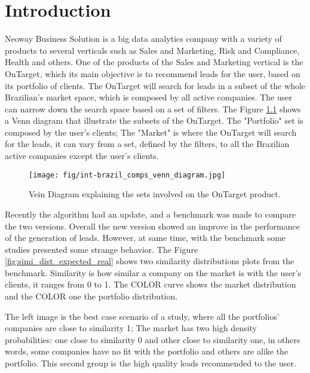 \chapter{Introduction} \label{cha:introduction}

\fancyhead[ER]{\sffamily\footnotesize{\leftmark}}
\fancyhead[OL]{\sffamily\footnotesize{\rightmark}}

Neoway Business Solution is a big data analytics company with a variety of products to several verticals such as Sales and Marketing, Risk and Compliance, Health and others. One of the products of the Sales and Marketing vertical is the OnTarget, which its main objective is to recommend leads for the user, based on its portfolio of clients. The OnTarget will search for leads in a subset of the whole Brazilian's market space, which is composed by all active companies. The user can narrow down the search space based on a set of filters. The Figure \ref{fig:braz_comps_venn_diagram} shows a Venn diagram that illustrate the subsets of the OnTarget. The "Portfolio" set is composed by the user's clients; The "Market" is where the OnTarget will search for the leads, it can vary from a set, defined by the filters, to all the Brazilian active companies except the user's clients.

\begin{figure}
   \centering
   \texttt{[image: fig/int-brazil\_comps\_venn\_diagram.jpg]}
   \caption{Vein Diagram explaining the sets involved on the OnTarget product.}
   \label{fig:braz_comps_venn_diagram}
\end{figure}

Recently the algorithm had an update, and a benchmark was made to compare the two versions. Overall the new version showed an improve in the performance of the generation of leads. However, at same time, with the benchmark some studies presented some strange behavior. The Figure \ref{fig:simi_dist_expected_real} shows two similarity distributions plots from the benchmark. Similarity is how similar a company on the market is with the user's clients, it ranges from 0 to 1. The COLOR curve shows the market distribution and the COLOR one the portfolio distribution.

The left image is the best case scenario of a study, where all the portfolios' companies are close to similarity 1; The market has two high density probabilities: one close to similarity 0 and other close to similarity one, in others words, some companies have no fit with the portfolio and others are alike the portfolio. This second group is the high quality leads recommended to the user.

